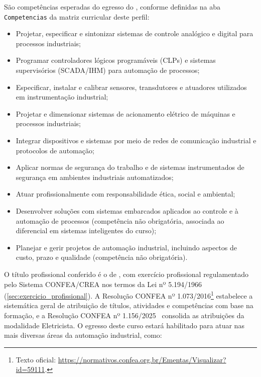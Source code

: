 São competências esperadas do egresso do \ppccurso, conforme definidas na aba \texttt{Competencias} da matriz curricular deste perfil:

\begin{itemize}
    \item Projetar, especificar e sintonizar sistemas de controle analógico e digital para processos industriais;
    \item Programar controladores lógicos programáveis (CLPs) e sistemas supervisórios (SCADA/IHM) para automação de processos;
    \item Especificar, instalar e calibrar sensores, transdutores e atuadores utilizados em instrumentação industrial;
    \item Projetar e dimensionar sistemas de acionamento elétrico de máquinas e processos industriais;
    \item Integrar dispositivos e sistemas por meio de redes de comunicação industrial e protocolos de automação;
    \item Aplicar normas de segurança do trabalho e de sistemas instrumentados de segurança em ambientes industriais automatizados;
    \item Atuar profissionalmente com responsabilidade ética, social e ambiental;
    \item Desenvolver soluções com sistemas embarcados aplicados ao controle e à automação de processos (competência não obrigatória, associada ao diferencial em sistemas inteligentes do curso);
    \item Planejar e gerir projetos de automação industrial, incluindo aspectos de custo, prazo e qualidade (competência não obrigatória).
\end{itemize}

O título profissional conferido é o de \textbf{\ppctitulacao}, com exercício profissional regulamentado pelo Sistema CONFEA/CREA nos termos da Lei nº 5.194/1966~\cite{brasil_lei_5194_1966} (\autoref{sec:exercicio_profissional}). A Resolução CONFEA nº 1.073/2016\footnote{Texto oficial: \url{https://normativos.confea.org.br/Ementas/Visualizar?id=59111}.} estabelece a sistemática geral de atribuição de títulos, atividades e competências com base na formação, e a Resolução CONFEA nº 1.156/2025~\cite{confea_1156_2025} consolida as atribuições da modalidade Eletricista. O egresso deste curso estará habilitado para atuar nas mais diversas áreas da automação industrial, como:

